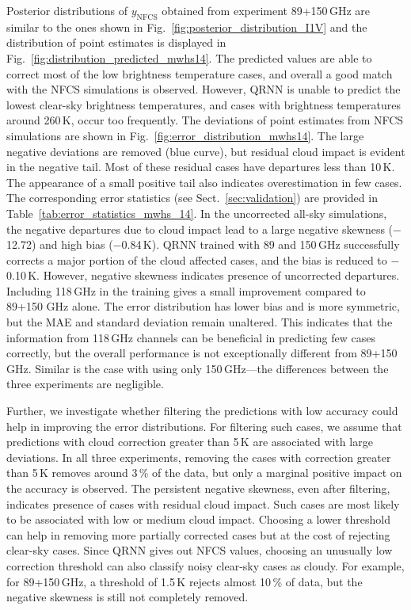 \documentclass[amt, manuscript]{copernicus}
\newcommand{\ynfcs}{y_\text{NFCS}}
\begin{document}
Posterior distributions of $\ynfcs$ obtained from experiment 89+150\,GHz are similar to the ones shown in Fig.~\ref{fig:posterior_distribution_I1V} and the distribution of point estimates is displayed in Fig.~\ref{fig:distribution_predicted_mwhs14}. The predicted values are able to correct most of the low brightness temperature cases, and overall a good match with the NFCS simulations is observed. However, QRNN is unable to predict the lowest clear-sky brightness temperatures, and cases with brightness temperatures around 260\,K, occur too frequently. The deviations of point estimates from NFCS simulations are shown in Fig.~\ref{fig:error_distribution_mwhs14}. The large negative deviations are removed (blue curve), but residual cloud impact is evident in the negative tail. Most of these residual cases have departures less than 10\,K. The appearance of a small positive tail also indicates overestimation in few cases. The corresponding error statistics (see Sect.~\ref{sec:validation}) are provided in  Table~\ref{tab:error_statistics_mwhs_14}. In the uncorrected all-sky simulations, the negative departures due to cloud impact lead to a large negative skewness ($-$12.72) and high bias ($-$0.84\,K). QRNN trained with 89 and 150\,GHz successfully corrects a major portion of the cloud affected cases, and the bias is reduced to $-$0.10\,K. However, negative skewness indicates presence of  uncorrected departures. Including 118\,GHz in the training gives a small improvement compared to 89+150 GHz alone. The error distribution has lower bias and is more symmetric, but the MAE and standard deviation remain unaltered. This indicates that the information from 118\,GHz channels can be beneficial in predicting few cases correctly, but the overall performance is not exceptionally different from 89+150\,GHz. Similar is the case with using only 150\,GHz---the differences between the three experiments are negligible.

Further, we investigate whether filtering the predictions with low accuracy could help in improving the error distributions. For filtering such cases, we assume that predictions with cloud correction greater than 5\,K are associated with large deviations. In all three experiments, removing the cases with correction greater than 5\,K removes around 3\,\% of the data, but only a marginal positive impact on the accuracy is observed. The persistent negative skewness, even after filtering, indicates presence of cases with residual cloud impact. Such cases are most likely to be associated with low or medium cloud impact. Choosing a lower threshold can help in removing more partially corrected cases but at the cost of rejecting clear-sky cases. Since QRNN gives out NFCS values, choosing an unusually low correction threshold can also classify noisy clear-sky cases as cloudy. For example, for 89+150\,GHz, a threshold of 1.5\,K rejects almost 10\,\% of data, but the negative skewness is still not completely removed.  
\end{document}
